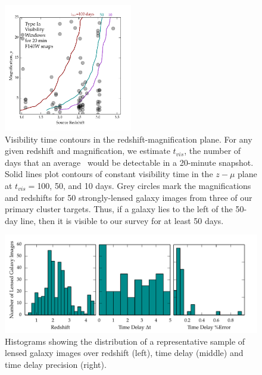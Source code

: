 \clearpage


\begin{figure}
  \centering
  \includegraphics[width=0.5\textwidth]{FIG/tvis_muz_20min.pdf}
  \caption{ \label{fig:tvis}
Visibility time contours in the redshift-magnification plane.  For any
given redshift and magnification, we estimate $t_{vis}$, the number of
days that an average \SNIa\ would be detectable in a 20-minute
snapshot.  Solid lines plot contours of constant visibility time in
the $z-\mu$ plane at $t_{vis}=$100, 50, and 10 days.  Grey circles
mark the magnifications and redshifts for 50 strongly-lensed galaxy
images from three of our primary cluster targets.  Thus, if a galaxy
lies to the left of the 50-day line, then it is visible to our survey
for at least 50 days. }
\end{figure}


\begin{figure}
  \includegraphics[width=\textwidth]{FIG/histograms.pdf}
  \caption{ \label{fig:tvis} Histograms showing the distribution of a
    representative sample of lensed galaxy images over redshift
    (left), time delay (middle) and time delay precision (right). 
}
\end{figure}

